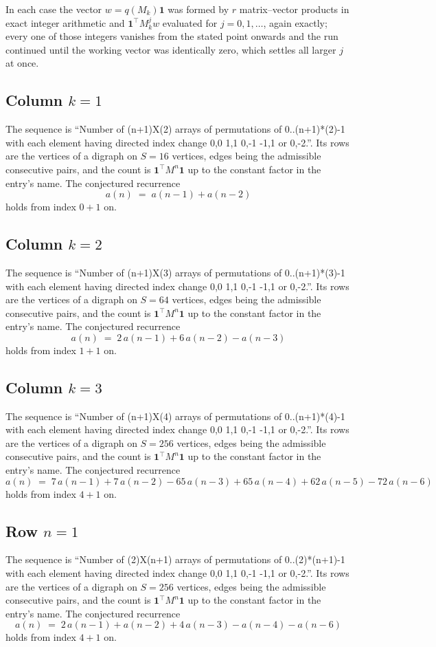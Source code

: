 \documentclass[11pt,a4paper]{article}
\theoremstyle{plain}
\theoremstyle{definition}
\begin{document}
In each case the vector $w=q(M_k)\mathbf{1}$ was formed by $r$ matrix--vector products in
exact integer arithmetic and $\mathbf{1}^{\!\top}M_k^{j}w$ evaluated for $j=0,1,\dots$,
again exactly; every one of those integers vanishes from the stated point onwards and the run
continued until the working vector was identically zero, which settles all larger $j$ at once.

\subsection*{Column $k$$=1$}
The sequence is ``Number of (n+1)X(2) arrays of permutations of 0..(n+1)*(2)-1 with each element having directed index change 0,0 1,1 0,-1 -1,1 or 0,-2.''. Its rows are the vertices of a digraph on
$S=16$ vertices, edges being the admissible consecutive pairs, and the count is
$\mathbf{1}^{\!\top}M^{n}\mathbf{1}$ up to the constant factor in the entry's name.
The conjectured recurrence
\[
a(n)\;=\;a(n-1) + a(n-2)
\]
holds from index $0+1$ on.

\subsection*{Column $k$$=2$}
The sequence is ``Number of (n+1)X(3) arrays of permutations of 0..(n+1)*(3)-1 with each element having directed index change 0,0 1,1 0,-1 -1,1 or 0,-2.''. Its rows are the vertices of a digraph on
$S=64$ vertices, edges being the admissible consecutive pairs, and the count is
$\mathbf{1}^{\!\top}M^{n}\mathbf{1}$ up to the constant factor in the entry's name.
The conjectured recurrence
\[
a(n)\;=\;2\,a(n-1) + 6\,a(n-2) - a(n-3)
\]
holds from index $1+1$ on.

\subsection*{Column $k$$=3$}
The sequence is ``Number of (n+1)X(4) arrays of permutations of 0..(n+1)*(4)-1 with each element having directed index change 0,0 1,1 0,-1 -1,1 or 0,-2.''. Its rows are the vertices of a digraph on
$S=256$ vertices, edges being the admissible consecutive pairs, and the count is
$\mathbf{1}^{\!\top}M^{n}\mathbf{1}$ up to the constant factor in the entry's name.
The conjectured recurrence
\[
a(n)\;=\;7\,a(n-1) + 7\,a(n-2) - 65\,a(n-3) + 65\,a(n-4) + 62\,a(n-5) - 72\,a(n-6)
\]
holds from index $4+1$ on.

\subsection*{Row $n$$=1$}
The sequence is ``Number of (2)X(n+1) arrays of permutations of 0..(2)*(n+1)-1 with each element having directed index change 0,0 1,1 0,-1 -1,1 or 0,-2.''. Its rows are the vertices of a digraph on
$S=256$ vertices, edges being the admissible consecutive pairs, and the count is
$\mathbf{1}^{\!\top}M^{n}\mathbf{1}$ up to the constant factor in the entry's name.
The conjectured recurrence
\[
a(n)\;=\;2\,a(n-1) + a(n-2) + 4\,a(n-3) - a(n-4) - a(n-6)
\]
holds from index $4+1$ on.
\end{document}
